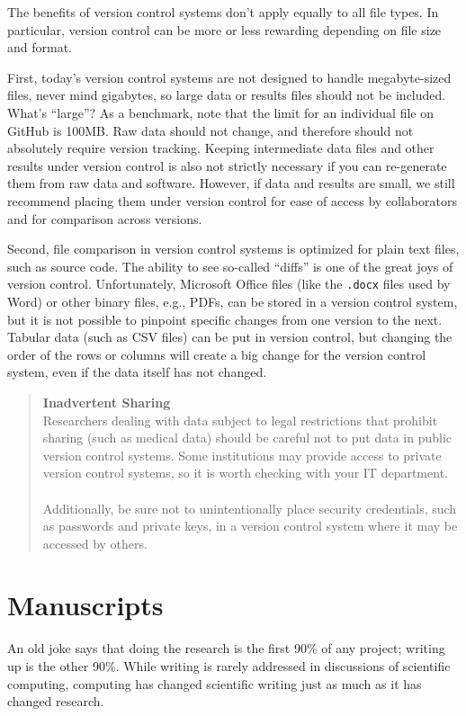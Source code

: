 \documentclass[10pt,letterpaper]{article}
\newcommand{\practicesection}[2]{\section{#1}\label{#2}}
\begin{document}
The benefits of version control systems don't apply equally to all file types.
In particular, version control can be more or less rewarding depending on file
size and format.

First, today's version control systems are not designed to handle
megabyte-sized files, never mind gigabytes, so large data or
results files should not be included. What's ``large''? As a benchmark, note that
the limit for an individual file on GitHub is 100MB. Raw data should not change,
and therefore should not absolutely require version tracking. Keeping
intermediate data files and other results under version control is also not
strictly necessary if you can re-generate them from raw data and
software. However, if data and results are small, we still recommend
placing them under version control for ease of access by collaborators
and for comparison across versions.

Second, file comparison in version control systems is optimized
for plain text files, such as source code. The ability to see so-called
``diffs'' is one of the great joys of version control. Unfortunately,
Microsoft Office files (like the \texttt{.docx} files used by Word) or other
binary files, e.g.,  PDFs, can be stored in a version control system,
but it is not possible to pinpoint specific changes from one version to the next.
Tabular data (such as CSV files) can be put in version control, but changing
the order of the rows or columns will create a big change for the version
control system, even if the data itself has not changed.

\begin{quote}
  \noindent \textbf{Inadvertent Sharing}
  \\
  Researchers dealing with data subject to legal restrictions that
  prohibit sharing (such as medical data) should be careful not to put
  data in public version control systems. Some institutions may
  provide access to private version control systems, so it is worth
  checking with your IT department.\\
  \\
  Additionally, be sure not to unintentionally place security credentials,
  such as passwords and private keys, in a version control system where it
  may be accessed by others.
\end{quote}

\practicesection{Manuscripts}{sec:manuscripts}

An old joke says that doing the research is the first 90\% of any
project; writing up is the other 90\%. While writing is rarely
addressed in discussions of scientific computing, computing has
changed scientific writing just as much as it has changed research.
\end{document}

